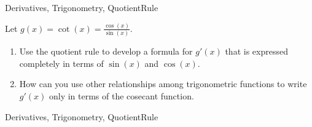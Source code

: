 
\begin{tagblock}{Derivatives, Trigonometry, QuotientRule}
\begin{question}
	






Let $g(x) = \cot(x) = \frac{\cos(x)}{\sin(x)}$.
\begin{enumerate}


\item Use the quotient rule to develop a formula for $g'(x)$ that is expressed completely in terms of $\sin(x)$ and $\cos(x).$

\vspace{1.5in}


\item How can you use other relationships among trigonometric functions to write $g'(x)$ only in terms of  the cosecant function.

\vspace{1.2in}


\end{enumerate}







	









	
	
\begin{tags}
	    Derivatives, Trigonometry, QuotientRule
\end{tags}
	
\begin{diary}
\end{diary}
	
\begin{solution}
	   
\end{solution}
	
\end{question}

\end{tagblock}

